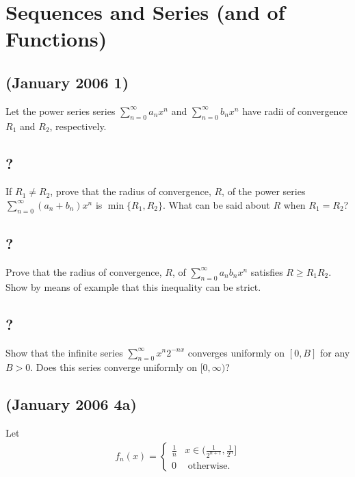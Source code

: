 \hypertarget{sequences-and-series-and-of-functions}{%
\section{Sequences and Series (and of
Functions)}\label{sequences-and-series-and-of-functions}}

\hypertarget{january-2006-1}{%
\subsection{(January 2006 1)}\label{january-2006-1}}

Let the power series series \(\sum_{n=0}^\infty a_nx^n\) and
\(\sum_{n=0}^\infty b_nx^n\) have radii of convergence \(R_1\) and
\(R_2\), respectively.

\hypertarget{section-20}{%
\subsection{?}\label{section-20}}

If \(R_1 \neq R_2\), prove that the radius of convergence, \(R\), of the
power series \(\sum_{n=0}^\infty (a_n+b_n)x^n\) is \(\min\{R_1, R_2\}\).
What can be said about \(R\) when \(R_1 = R_2\)?

\hypertarget{section-21}{%
\subsection{?}\label{section-21}}

Prove that the radius of convergence, \(R\), of
\(\sum_{n=0}^\infty a_nb_nx^n\) satisfies \(R \geq R_1R_2\). Show by
means of example that this inequality can be strict.

\hypertarget{section-22}{%
\subsection{?}\label{section-22}}

Show that the infinite series \(\sum_{n=0}^\infty x^n2^{-nx}\) converges
uniformly on \([0,B]\) for any \(B > 0\). Does this series converge
uniformly on \([0,\infty)\)?

\hypertarget{january-2006-4a}{%
\subsection{(January 2006 4a)}\label{january-2006-4a}}

Let
\begin{align*}f_n(x) = \begin{cases} \frac{1}{n}  & x \in (\frac{1}{2^{n+1}}, \frac{1}{2^n}] \\ 0 & \text{ otherwise}.\end{cases}\end{align*}

